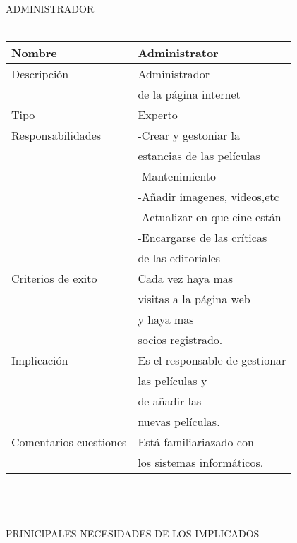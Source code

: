 \documentclass{article}
\begin{document}
ADMINISTRADOR
\\ \\
\begin{tabular}{||l | l ||}
\hline
\hline
Nombre & Administrator \\
\hline
Descripción & Administrador \\&  de la página internet\\
\hline
Tipo & Experto \\
\hline
Responsabilidades & -Crear y gestoniar la \\&estancias de las películas \\& -Mantenimiento \\& -Añadir imagenes, videos,etc \\& -Actualizar en que cine están \\& -Encargarse de las críticas \\&de las editoriales\\  
\hline
Criterios de exito & Cada vez haya mas \\&visitas a la página web \\&y haya mas \\&socios registrado. \\
\hline
Implicación & Es el responsable de  gestionar \\&las películas y \\&de añadir las\\& nuevas películas. \\
\hline
Comentarios cuestiones & Está familiariazado con \\& los sistemas informáticos. \\
\hline
\hline
\end{tabular}
\\ \\ \\
PRINICIPALES NECESIDADES DE LOS IMPLICADOS
\\ 
\end{document}
